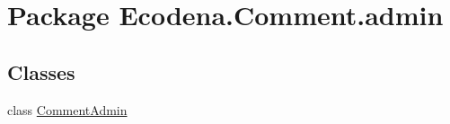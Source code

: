 \hypertarget{namespace_ecodena_1_1_comment_1_1admin}{
\section{Package Ecodena.Comment.admin}
\label{d0/d2e/namespace_ecodena_1_1_comment_1_1admin}
}
\subsection*{Classes}
\begin{DoxyCompactItemize}
\item 
class \hyperlink{class_ecodena_1_1_comment_1_1admin_1_1_comment_admin}{CommentAdmin}
\end{DoxyCompactItemize}
